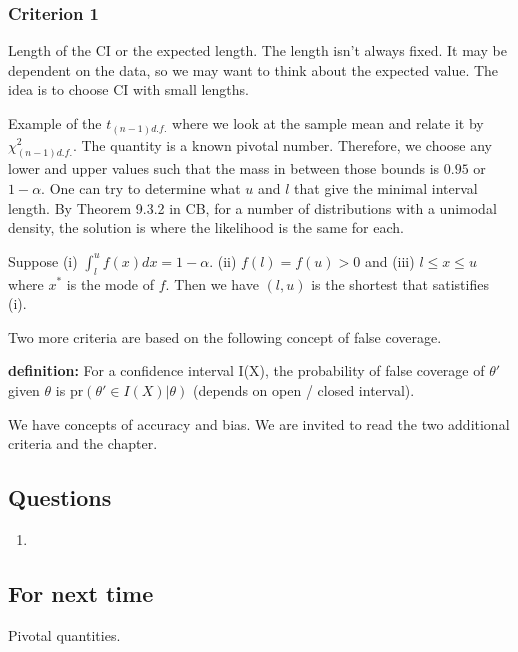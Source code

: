 \documentclass[letterpaper, 12pt]{article}
\theoremstyle{definition}
\theoremstyle{plain}
\newcommand{\pr}{\text{pr}}
\begin{document}
\subsubsection*{Criterion 1}
Length of the CI or the expected length. The length isn't always fixed. It may be dependent on the data, so we may want to think about the expected value. The idea is to choose CI with small lengths.

Example of the $t_{(n-1) d.f.}$ where we look at the sample mean and relate it by $\chi^2_{(n-1) d.f.}$. The quantity is a known pivotal number. Therefore, we choose any lower and upper values such that the mass in between those bounds is $0.95$ or $1-\alpha$. One can try to determine what $u$ and $l$ that give the minimal interval length. By Theorem 9.3.2 in CB, for a number of distributions with a unimodal density, the solution is where the likelihood is the same for each.

Suppose (i) $\int_l^u f(x) dx = 1 - \alpha$. (ii) $f(l) = f(u) >0$ and (iii) $l \leq x \leq u$ where $x^*$ is the mode of $f$. Then we have $(l, u)$ is the shortest that satistifies (i).

Two more criteria are based on the following concept of false coverage.

\textbf{definition:} For a confidence interval I(X), the probability of false coverage of $\theta'$ given $\theta$ is 
$\pr(\theta' \in I(X) | \theta)$ (depends on open / closed interval).

We have concepts of accuracy and bias. We are invited to read the two additional criteria and the chapter.

\subsection*{Questions}
\begin{enumerate}
\item

\end{enumerate}

\subsection*{For next time}
Pivotal quantities.
\end{document}

